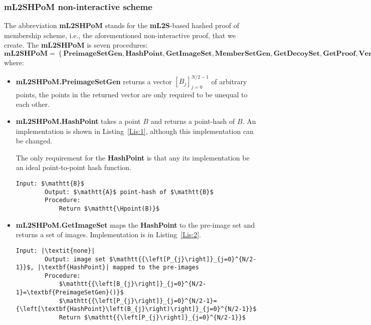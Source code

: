 \documentclass{mathcryptology} %
\newcommand{\Hpoint}{\textbf{H}_{\textbf{point}}}
\theoremstyle{title}
\theoremstyle{titleof}
\begin{document}
\subsubsection{mL2SHPoM non-interactive scheme}
    The abbreviation \textbf{mL2SHPoM} stands for the \textbf{mL2S}-based hashed proof of membership scheme, i.e., the aforementioned non-interactive proof, that we create.
    The \textbf{mL2SHPoM} is seven procedures:
    \begin{equation*}
        \textbf{mL2SHPoM} = \left\{
        \textbf{PreimageSetGen},
        \textbf{HashPoint},
        \textbf{GetImageSet},
        \textbf{MemberSetGen},
        \textbf{GetDecoySet},
        \textbf{GetProof},
        \textbf{Verif}
        \right\},
    \end{equation*}
    where:
    \begin{itemize}
        \item \textbf{mL2SHPoM.PreimageSetGen} returns a vector ${\left[B_{j}\right]}_{j=0}^{N/2-1}$ of arbitrary points, the points in the returned vector are only required to be unequal to each other.
        \item \textbf{mL2SHPoM.HashPoint} takes a point $B$ and returns a point-hash of $B$. An implementation is shown in Listing~\ref{Lis:1}, although this implementation can be changed.

        The only requirement for the \textbf{HashPoint} is that any its implementation be an ideal point-to-point hash function.

        \begin{mdframed}[backgroundcolor=black!10!white]
        \begin{lstlisting}[caption={\textbf{mL2SHPoM.HashPoint} initial implementation.},label={Lis:1}]
        Input: $\mathtt{B}$
        Output: $\mathtt{A}$ point-hash of $\mathtt{B}$
        Procedure:
            Return $\mathtt{\Hpoint(B)}$
        \end{lstlisting}
        \end{mdframed}

        \item \textbf{mL2SHPoM.GetImageSet} maps the \textbf{HashPoint} to the pre-image set and returns a set of images. Implementation is in Listing~\ref{Lis:2}.

        \begin{mdframed}[backgroundcolor=black!10!white]
        \begin{lstlisting}[caption={\textbf{mL2SHPoM.GetImageSet} implementation.},label={Lis:2}]
        Input: |\textit{none}|
        Output: image set $\mathtt{{\left[P_{j}\right]}_{j=0}^{N/2-1}}$, |\textbf{HashPoint}| mapped to the pre-images
        Procedure:
            $\mathtt{{\left[B_{j}\right]}_{j=0}^{N/2-1}=\textbf{PreimageSetGen}()}$
            $\mathtt{{\left[P_{j}\right]}_{j=0}^{N/2-1}={\left[\textbf{HashPoint}\left(B_{j}\right)\right]}_{j=0}^{N/2-1}}$
            Return $\mathtt{{\left[P_{j}\right]}_{j=0}^{N/2-1}}$
        \end{lstlisting}
        \end{mdframed}


\end{itemize}
\end{document}

